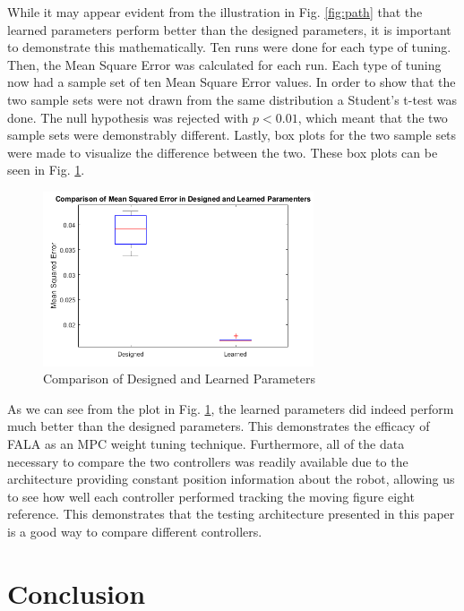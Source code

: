 \documentclass[conference]{IEEEtran}
\begin{document}
While it may appear evident from the illustration in Fig. \ref{fig:path} that the learned parameters perform better than the designed parameters, it is important to demonstrate this mathematically. Ten runs were done for each type of tuning. Then, the Mean Square Error was calculated for each run. Each type of tuning now had a sample set of ten Mean Square Error values. In order to show that the two sample sets were not drawn from the same distribution a Student's t-test was done. The null hypothesis was rejected with $p<0.01$, which meant that the two sample sets were demonstrably different. Lastly, box plots for the two sample sets were made to visualize the difference between the two. These box plots can be seen in Fig. \ref{fig:Results}.

\begin{figure}[tb]
\centering
\includegraphics[width=80mm]{Results.png}
\caption{Comparison of Designed and Learned Parameters}
\label{fig:Results}
\end{figure} 

As we can see from the plot in Fig. \ref{fig:Results}, the learned parameters did indeed perform much better than the designed parameters. This demonstrates the efficacy of FALA as an MPC weight tuning technique. Furthermore, all of the data necessary to compare the two controllers was readily available due to the architecture providing constant position information about the robot, allowing us to see how well each controller performed tracking the moving figure eight reference. This demonstrates that the testing architecture presented in this paper is a good way to compare different controllers.

\section{Conclusion} \label{sec:conc}
\end{document}
